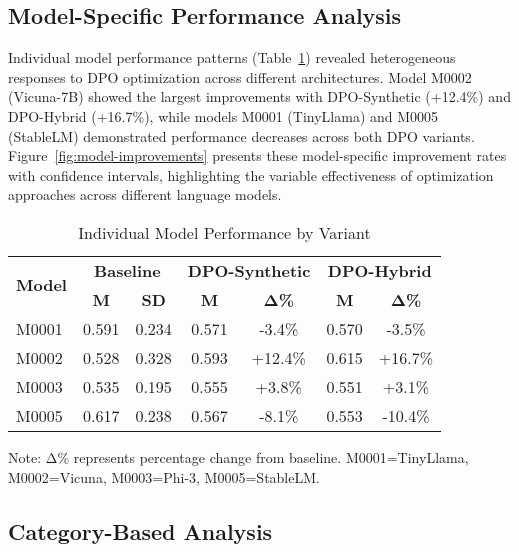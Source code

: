 \subsection{Model-Specific Performance Analysis}

Individual model performance patterns (Table~\ref{tab:model-specific}) revealed heterogeneous responses to DPO optimization across different architectures. Model M0002 (Vicuna-7B) showed the largest improvements with DPO-Synthetic (+12.4\%) and DPO-Hybrid (+16.7\%), while models M0001 (TinyLlama) and M0005 (StableLM) demonstrated performance decreases across both DPO variants. Figure~\ref{fig:model-improvements} presents these model-specific improvement rates with confidence intervals, highlighting the variable effectiveness of optimization approaches across different language models.

\begin{table}[htbp]
\centering
\caption{Individual Model Performance by Variant}
\label{tab:model-specific}
\begin{tabular}{lcccccc}
\toprule
\multirow{2}{*}{\textbf{Model}} & \multicolumn{2}{c}{\textbf{Baseline}} & \multicolumn{2}{c}{\textbf{DPO-Synthetic}} & \multicolumn{2}{c}{\textbf{DPO-Hybrid}} \\
\cmidrule(lr){2-3} \cmidrule(lr){4-5} \cmidrule(lr){6-7}
& \textbf{M} & \textbf{SD} & \textbf{M} & \textbf{Δ\%} & \textbf{M} & \textbf{Δ\%} \\
\midrule
M0001 & 0.591 & 0.234 & 0.571 & -3.4\% & 0.570 & -3.5\% \\
M0002 & 0.528 & 0.328 & 0.593 & +12.4\% & 0.615 & +16.7\% \\
M0003 & 0.535 & 0.195 & 0.555 & +3.8\% & 0.551 & +3.1\% \\
M0005 & 0.617 & 0.238 & 0.567 & -8.1\% & 0.553 & -10.4\% \\

\bottomrule
\end{tabular}
\begin{tablenotes}
\small
\item Note: Δ\% represents percentage change from baseline. M0001=TinyLlama, M0002=Vicuna, M0003=Phi-3, M0005=StableLM.
\end{tablenotes}
\end{table}

\subsection{Category-Based Analysis}

